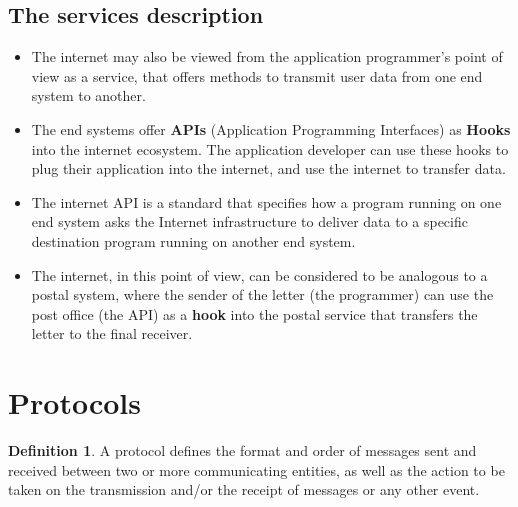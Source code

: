 \documentclass{article}
\theoremstyle{plain}
\theoremstyle{definition}
\newtheorem{defn}{Definition} %
\begin{document}
\subsection{The services description}
\begin{itemize}
    \item The internet may also be viewed from the application programmer's point of view as a service, that offers methods to transmit user data from one end system to another.
    
    \item The end systems offer \textbf{APIs} (Application Programming Interfaces) as \textbf{Hooks} into the internet ecosystem. The application developer can use these hooks to plug their application into the internet, and use the internet to transfer data.
    
    \item The internet API is a standard that specifies how a program running on one end system asks the Internet infrastructure to deliver data to a specific destination program running on another end system.
    
    \item The internet, in this point of view, can be considered to be analogous to a postal system, where the sender of the letter (the programmer) can use the post office (the API) as a \textbf{hook} into the postal service that transfers the letter to the final receiver. 
\end{itemize}

\section{Protocols}

\begin{defn}
    A protocol defines the format and order of messages sent and received between two or more communicating entities, as well as the action to be taken on the transmission and/or the receipt of messages or any other event. 
\end{defn}
\end{document}
